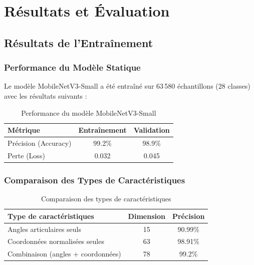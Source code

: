 \chapter{Résultats et Évaluation}

\section{Résultats de l'Entraînement}

\subsection{Performance du Modèle Statique}

Le modèle MobileNetV3-Small a été entraîné sur 63\,580 échantillons (28 classes) avec les résultats suivants :

\begin{table}[H]
    \centering
    \begin{tabular}{lcc}
        \toprule
        \textbf{Métrique} & \textbf{Entraînement} & \textbf{Validation} \\
        \midrule
        Précision (Accuracy) & 99.2\% & 98.9\% \\
        Perte (Loss) & 0.032 & 0.045 \\
        \bottomrule
    \end{tabular}
    \caption{Performance du modèle MobileNetV3-Small}
\end{table}

\subsection{Comparaison des Types de Caractéristiques}

\begin{table}[H]
    \centering
    \begin{tabular}{lcc}
        \toprule
        \textbf{Type de caractéristiques} & \textbf{Dimension} & \textbf{Précision} \\
        \midrule
        Angles articulaires seuls & 15 & 90.99\% \\
        Coordonnées normalisées seules & 63 & 98.91\% \\
        Combinaison (angles + coordonnées) & 78 & 99.2\% \\
        \bottomrule
    \end{tabular}
    \caption{Comparaison des types de caractéristiques}
\end{table}

